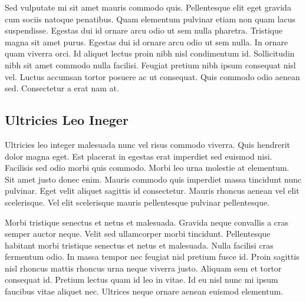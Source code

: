 \documentclass{article}
\begin{document}
Sed vulputate mi sit amet mauris commodo quis. Pellentesque elit eget gravida cum sociis natoque penatibus. Quam elementum pulvinar etiam non quam lacus suspendisse. Egestas dui id ornare arcu odio ut sem nulla pharetra. Tristique magna sit amet purus. Egestas dui id ornare arcu odio ut sem nulla. In ornare quam viverra orci. Id aliquet lectus proin nibh nisl condimentum id. Sollicitudin nibh sit amet commodo nulla facilisi. Feugiat pretium nibh ipsum consequat nisl vel. Luctus accumsan tortor posuere ac ut consequat. Quis commodo odio aenean sed. Consectetur a erat nam at.

\subsection{Ultricies Leo Ineger}

Ultricies leo integer malesuada nunc vel risus commodo viverra. Quis hendrerit dolor magna eget. Est placerat in egestas erat imperdiet sed euismod nisi. Facilisis sed odio morbi quis commodo. Morbi leo urna molestie at elementum. Sit amet justo donec enim. Mauris commodo quis imperdiet massa tincidunt nunc pulvinar. Eget velit aliquet sagittis id consectetur. Mauris rhoncus aenean vel elit scelerisque. Vel elit scelerisque mauris pellentesque pulvinar pellentesque.

Morbi tristique senectus et netus et malesuada. Gravida neque convallis a cras semper auctor neque. Velit sed ullamcorper morbi tincidunt. Pellentesque habitant morbi tristique senectus et netus et malesuada. Nulla facilisi cras fermentum odio. In massa tempor nec feugiat nisl pretium fusce id. Proin sagittis nisl rhoncus mattis rhoncus urna neque viverra justo. Aliquam sem et tortor consequat id. Pretium lectus quam id leo in vitae. Id eu nisl nunc mi ipsum faucibus vitae aliquet nec. Ultrices neque ornare aenean euismod elementum.

\newpage
\printbibliography
\newpage

\end{document}
